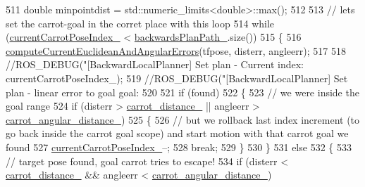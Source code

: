 \begin{DoxyCode}
511             \textcolor{keywordtype}{double} minpointdist = std::numeric\_limits<double>::max();
512 
513             \textcolor{comment}{// lets set the carrot-goal in the corret place with this loop}
514             \textcolor{keywordflow}{while} (\hyperlink{classcl__move__base__z_1_1backward__local__planner_1_1BackwardLocalPlanner_a2e8f2b78bc97f27c5fa431f3af2261ed}{currentCarrotPoseIndex\_} < 
      \hyperlink{classcl__move__base__z_1_1backward__local__planner_1_1BackwardLocalPlanner_ad9cde5c85f782cab2ddb4030e3c3f2cf}{backwardsPlanPath\_}.size())
515             \{
516                 \hyperlink{classcl__move__base__z_1_1backward__local__planner_1_1BackwardLocalPlanner_a843f030138afe0a28cf11a729fa67383}{computeCurrentEuclideanAndAngularErrors}(tfpose, 
      disterr, angleerr);
517 
518                 \textcolor{comment}{//ROS\_DEBUG("[BackwardLocalPlanner] Set plan - Current index: %
       currentCarrotPoseIndex\_);}
519                 \textcolor{comment}{//ROS\_DEBUG("[BackwardLocalPlanner] Set plan - linear error to goal %
       goal: %
520 
521                 \textcolor{keywordflow}{if} (found)
522                 \{
523                     \textcolor{comment}{// we were inside the goal range}
524                     \textcolor{keywordflow}{if} (disterr > \hyperlink{classcl__move__base__z_1_1backward__local__planner_1_1BackwardLocalPlanner_a0bbb80ce5bae865c4322869422803296}{carrot\_distance\_} || angleerr > 
      \hyperlink{classcl__move__base__z_1_1backward__local__planner_1_1BackwardLocalPlanner_a63e30befa09c4a67cf55086923b760c7}{carrot\_angular\_distance\_})
525                     \{
526                         \textcolor{comment}{// but we rollback last index increment (to go back inside the carrot goal scope)
       and start motion with that carrot goal we found}
527                         \hyperlink{classcl__move__base__z_1_1backward__local__planner_1_1BackwardLocalPlanner_a2e8f2b78bc97f27c5fa431f3af2261ed}{currentCarrotPoseIndex\_}--;
528                         \textcolor{keywordflow}{break};
529                     \}
530                 \}
531                 \textcolor{keywordflow}{else}
532                 \{
533                     \textcolor{comment}{// target pose found, goal carrot tries to escape!}
534                     \textcolor{keywordflow}{if} (disterr < \hyperlink{classcl__move__base__z_1_1backward__local__planner_1_1BackwardLocalPlanner_a0bbb80ce5bae865c4322869422803296}{carrot\_distance\_} && angleerr < 
      \hyperlink{classcl__move__base__z_1_1backward__local__planner_1_1BackwardLocalPlanner_a63e30befa09c4a67cf55086923b760c7}{carrot\_angular\_distance\_})
}
\end{DoxyCode}
